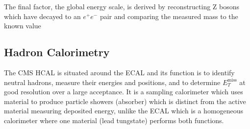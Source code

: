 The final factor, the global energy scale, is derived by reconstructing Z bosons which have decayed to an $e^{+}e^{-}$ pair and comparing the measured mass to the known value














\subsection{Hadron Calorimetry}
The CMS HCAL \cite{cmsHcal} is situated around the ECAL and its function is to identify neutral hadrons, measure their energies and positions, and to determine $E_{T}^{\mathrm{miss}}$ at good resolution over a large acceptance.
It is a sampling calorimeter which uses material to produce particle showers (absorber) which is distinct from the active material measuring deposited energy, unlike the ECAL which is a homogeneous calorimeter where one material (lead tungstate) performs both functions. 

